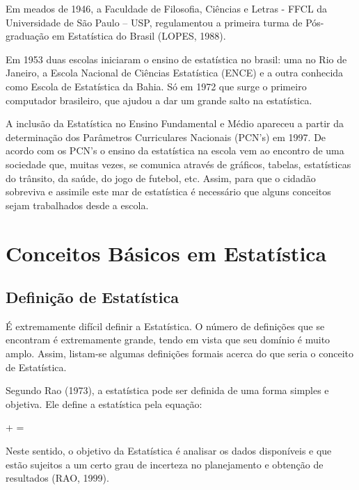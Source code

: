 \inic Em meados de 1946, a Faculdade de Filosofia, Ciências e Letras - FFCL da Universidade de São Paulo – USP, regulamentou a primeira turma de Pós-graduação em Estatística do Brasil (LOPES, 1988).\vskip0.3cm


\inic Em 1953 duas escolas iniciaram o ensino de estatística no brasil: uma no
Rio de Janeiro, a Escola Nacional de Ciências Estatística (ENCE) e
a outra conhecida como Escola de Estatística da Bahia. Só em 1972
que surge o primeiro computador brasileiro, que ajudou a dar um
grande salto na estatística.\vskip0.3cm


\inic A inclusão da Estatística no Ensino Fundamental e Médio apareceu a
partir da determinação dos Parâmetros Curriculares Nacionais
(PCN's) em 1997. De acordo com os PCN's o ensino da estatística na
escola vem ao encontro de uma sociedade que, muitas vezes, se
comunica através de gráficos, tabelas, estatísticas do trânsito,
da saúde, do jogo de futebol, etc. Assim, para que o cidadão
sobreviva e assimile este mar de estatística é necessário que
alguns conceitos sejam trabalhados desde a escola.


\section{Conceitos Básicos em Estatística}

\subsection{Definição de Estatística}

\inic É extremamente difícil definir a Estatística. O número de definições
que se encontram é extremamente grande, tendo em vista que seu domínio é
muito amplo. Assim, listam-se algumas definições formais acerca do que
seria o conceito de Estatística.\vskip0.3cm

Segundo Rao (1973), a estatística pode ser definida de uma forma
simples e objetiva. Ele define a estatística pela equação:


\begin{center}
+  = 
\end{center}

 

Neste sentido, o objetivo da Estatística é analisar os dados disponíveis e que estão sujeitos a um certo grau de incerteza no planejamento e obtenção de resultados (RAO, 1999).\vskip0.3cm


